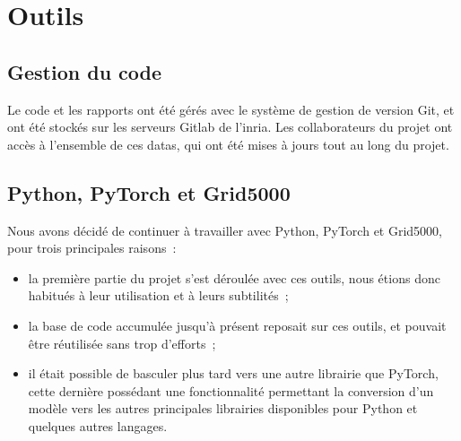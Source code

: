 \section{Outils}
\subsection{Gestion du code}
Le code et les rapports ont été gérés avec le système de gestion de version Git, et ont été stockés sur les serveurs Gitlab de l'\gls{inria}. Les collaborateurs du projet ont accès à l'ensemble de ces \glspl{data}, qui ont été mises à jours tout au long du projet.

\subsection{Python, PyTorch et Grid5000}
Nous avons décidé de continuer à travailler avec Python, PyTorch et Grid5000, pour trois principales raisons~:
\begin{itemize}
	\item la première partie du projet s'est déroulée avec ces outils, nous étions donc habitués à leur utilisation et à leurs subtilités~;
	\item la base de code accumulée jusqu'à présent reposait sur ces outils, et pouvait être réutilisée sans trop d'efforts~;
	\item il était possible de basculer plus tard vers une autre librairie que  PyTorch, cette dernière possédant une fonctionnalité permettant la conversion d'un modèle vers les autres principales librairies disponibles pour Python et quelques autres langages.
\end{itemize}